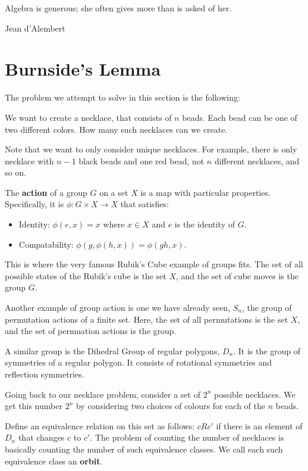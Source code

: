 \epigraph{Algebra is generous; she often gives more than is asked of her.}{Jean d’Alembert}

\section{Burnside's Lemma}
The problem we attempt to solve in this section is the following:
\par
We want to create a necklace, that consists of $n$ beads.
Each bead can be one of two different colors.
How many such necklaces can we create.
\par
Note that we want to only consider unique necklaces.
For example, there is only necklace with $n-1$ black beads and one red bead, not $n$ different necklaces, and so on.
\begin{definition} \label{def:groupaction}
  The \textbf{action} of a group $G$ on a set $X$ is a map with particular properties.
  Specifically, it is $\phi: G \times X \rightarrow X$ that satisfies:
  \begin{itemize}
    \item Identity: $\phi(e, x) = x$ where $x \in X$ and $e$ is the identity of $G$.
    \item Compatability: $\phi(g, \phi(h, x)) = \phi(gh, x)$.
  \end{itemize}
\end{definition}
This is where the very famous Rubik's Cube example of groups fits.
The set of all possible states of the Rubik's cube is the set $X$, and the set of cube moves is the group $G$.
\par
Another example of group action is one we have already seen, $S_{n}$, the group of permutation actions of a finite set.
Here, the set of all permutations is the set $X$, and the set of permuation actions is the group.
\par
A similar group is the Dihedral Group of regular polygons, $D_{n}$.
It is the group of symmetries of a regular polygon.
It consists of rotational symmetries and reflection symmetries.
\par
Going back to our necklace problem, consider a set of $2^{n}$ possible necklaces.
We get this number $2^{n}$ by considering two choices of colours for each of the $n$ beads.
\par
Define an equivalence relation on this set as follows: $cRc'$ if there is an element of $D_{n}$ that changes $c$ to $c'$.
The problem of counting the number of necklaces is basically counting the number of such equivalence classes.
We call each such equivalence class an \textbf{orbit}.
